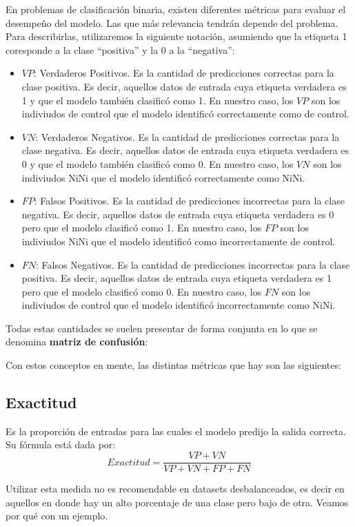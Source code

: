 \documentclass[../../main.tex]{subfiles}
\begin{document}
En problemas de clasificación binaria, existen diferentes métricas para evaluar el
desempeño del modelo. Las que más relevancia tendrán depende del problema. Para
describirlas, utilizaremos la siguiente notación, asumiendo que la etiqueta 1 coresponde a
la clase ``positiva'' y la 0 a la ``negativa'':
\begin{itemize}
    \item \(VP\): Verdaderos Positivos. Es la cantidad de predicciones correctas para la
    clase positiva. Es decir, aquellos datos de entrada cuya etiqueta verdadera es 1 y que
    el modelo también clasificó como 1. En nuestro caso, los \(VP\) son los indiviudos de
    control que el modelo identificó correctamente como de control.
    \item \(VN\): Verdaderos Negativos. Es la cantidad de predicciones correctas para la
    clase negativa. Es decir, aquellos datos de entrada cuya etiqueta verdadera es 0 y que
    el modelo también clasificó como 0. En nuestro caso, los \(VN\) son los indiviudos NiNi
    que el modelo identificó correctamente como NiNi.
    \item \(FP\): Falsos Positivos. Es la cantidad de predicciones incorrectas para la
    clase negativa. Es decir, aquellos datos de entrada cuya etiqueta verdadera es 0 pero
    que el modelo clasificó como 1. En nuestro caso, los \(FP\) son los indiviudos NiNi que el
    modelo identificó como incorrectamente de control.
    \item \(FN\): Falsos Negativos. Es la cantidad de predicciones incorrectas para la
    clase positiva. Es decir, aquellos datos de entrada cuya etiqueta verdadera es 1 pero
    que el modelo clasificó como 0. En nuestro caso, los \(FN\) son los indiviudos de control
    que el modelo identificó incorrectamente como NiNi.
\end{itemize}

Todas estas cantidades se suelen presentar de forma conjunta en lo que se denomina
\textbf{matriz de confusión}:

Con estos conceptos en mente, las distintas métricas que hay son las siguientes:
\subsection{Exactitud}
Es la proporción de entradas para las cuales el modelo predijo la salida correcta.
Su fórmula está dada por:
\[
    Exactitud = \frac{VP + VN}{VP + VN + FP + FN}
\]

Utilizar esta medida no es recomendable en datasets desbalanceados, es decir en aquellos
en donde hay un alto porcentaje de una clase pero bajo de otra. Veamos por qué con un
ejemplo.
\end{document}
